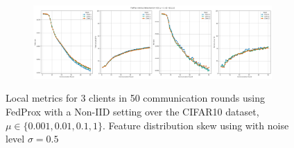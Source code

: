 \begin{figure}[H]
    \begin{subfigure}{\linewidth}
        \centering
        \includegraphics[width=0.8\linewidth]{figures/2-Federated_Learning/FedProx_NoiseLevel_Mu_1.png}
    \end{subfigure}

    \caption{Local metrics for 3 clients in 50 communication rounds using FedProx with a Non-IID setting over the CIFAR10 dataset, $\mu \in \{0.001, 0.01, 0.1, 1\}$. Feature distribution skew using with noise level $\sigma = 0.5$}
    \label{fig:FedProx_Non_IID_NoiseLevel_05}
\end{figure}
